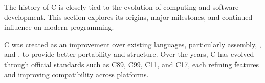 \begin{NxSSBox}[][History of C]
	\begin{NxIDBox}
		The history of C is closely tied to the evolution of computing and software development. This section explores its origins, major milestones, and continued influence on modern programming.
	\end{NxIDBox}
	\begin{NxIDBoxL}
		 C was created as an improvement over existing languages, particularly assembly, , and , to provide better portability and structure.
		 Over the years, C has evolved through official standards such as C89, C99, C11, and C17, each refining features and improving compatibility across platforms.
	\end{NxIDBoxL}
\end{NxSSBox}



